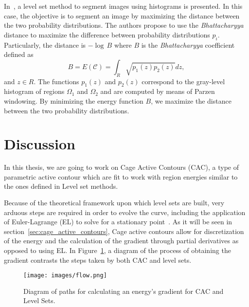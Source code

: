 In~\cite{Michailovich2007}, a level set method to segment images using
histograms is presented. In this case, the objective is to segment an image by
maximizing the distance between the two probability distributions.  The authors
propose to use the \emph{Bhattacharyya} distance to maximize the difference
between probability distributions $p_i$. Particularly, the distance is $-\log\,
B$ where $B$ is the \emph{Bhattacharyya} coefficient defined as
\begin{equation} \label{eq:level_set_histogram}
B=E(\mathcal{C})=\int_{R}\sqrt{p_{1}(z)p_{2}(z)}dz,
\end{equation}
and $z\in R$. The functions $p_1(z)$ and $p_2(z)$ correspond to the gray-level
histogram of regions $\Omega_1$ and $\Omega_2$ and are computed by means of
Parzen windowing.  By minimizing the energy function $B$, we maximize the
distance between the two probability distributions.


\section{Discussion}
\label{sec:discussion}

In this thesis, we are going to work on Cage Active Contours (CAC), a type of parametric active contour which are fit to work with region energies similar to the ones defined in Level set methods\cite{ipcac2015}.

 Because of the theoretical framework upon which level sets are built, very arduous steps are required in order to evolve the curve, including the application of Euler-Lagrange (EL) to solve for a stationary point~\cite{Caselles1993}. As it will be seen in section~\ref{sec:cage_active_contours}, Cage active contours allow for discretization of the energy and the calculation of the gradient through partial derivatives as opposed to using EL. In Figure~\ref{fig:flow_energies}, a diagram of the process of obtaining the gradient contrasts the steps taken by both CAC and level sets. 
\begin{figure}[h!]
	\centering
	{\texttt{[image: images/flow.png]}}
	\caption{Diagram of paths for calculating an energy's gradient for CAC and Level Sets.}
	\label{fig:flow_energies}
\end{figure}